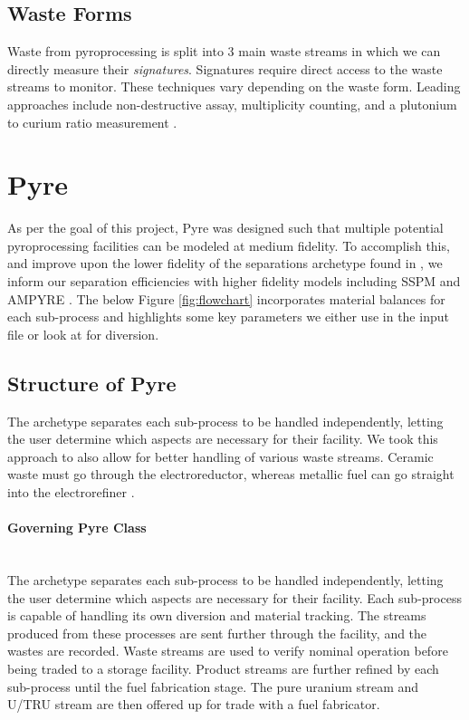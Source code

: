 \subsection{Waste Forms}

Waste from pyroprocessing is split into 3 main waste streams in which we can directly measure their \emph{signatures}. Signatures require direct access to the waste streams to monitor.
These techniques vary depending on the waste form. Leading approaches include non-destructive assay, multiplicity counting, and a plutonium to curium ratio measurement \cite{lee_determination_2012,noauthor_non-destructive_nodate}.

\section{Pyre}

As per the goal of this project, Pyre was designed such that multiple potential pyroprocessing facilities can be modeled at medium fidelity. To accomplish this, and improve upon
the lower fidelity of the separations archetype found in \Cycamore, we inform our separation efficiencies with higher fidelity models including SSPM and AMPYRE \cite{cipiti_modeling_2012,maggos_update_2015}. The below Figure \ref{fig:flowchart} incorporates material balances for each sub-process and highlights some key parameters we
either use in the input file or look at for diversion.

\subsection{Structure of Pyre}

The archetype separates each sub-process to be handled independently, letting the user determine which aspects are necessary for their facility. We took this approach to also
allow for better handling of various waste streams. Ceramic waste must go through the electroreductor, whereas metallic fuel can go straight into the electrorefiner \cite{michael_f._simpson_developments_2012}. 
\paragraph{Governing Pyre Class} \mbox{}\\
The archetype separates each sub-process to be handled independently, letting the user determine which aspects are necessary for their facility. Each sub-process is capable
of handling its own diversion and material tracking. The streams produced from these processes are sent further through the facility, and the wastes are recorded. Waste streams are
used to verify nominal operation before being traded to a storage facility. Product streams are further refined by each sub-process until the fuel fabrication stage.
The pure uranium stream and U/TRU stream are then offered up for trade with a fuel fabricator.


